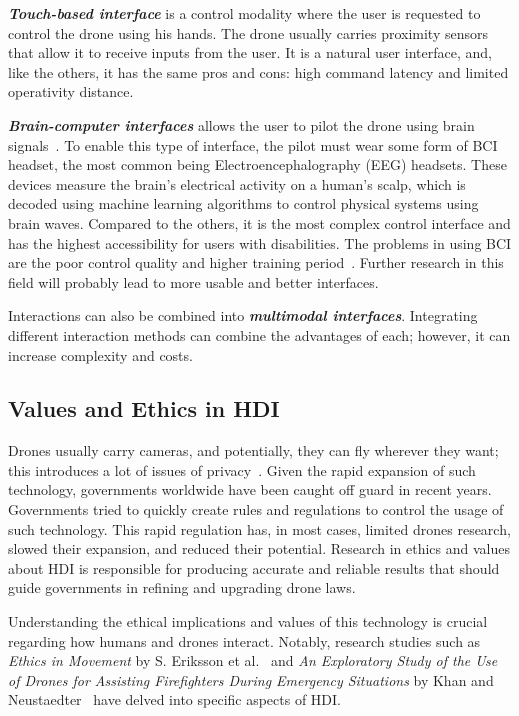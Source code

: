 \textbf{\textit{Touch-based interface}} is a control modality where the user is requested to control the drone using his hands. 
The drone usually carries proximity sensors that allow it to receive inputs from the user. 
It is a natural user interface, and, like the others, it has the same pros and cons: high command latency and limited operativity distance.

\textbf{\textit{Brain-computer interfaces}} allows the user to pilot the drone using brain signals~\cite{lafleur2013quadcopterBCI}.
To enable this type of interface, the pilot must wear some form of BCI headset, the most common being 
Electroencephalography (EEG) headsets. These devices measure the brain's electrical activity on a human's scalp, 
which is decoded using machine learning algorithms to control physical systems using brain waves. 
Compared to the others, it is the most complex control interface and has the highest accessibility for users with disabilities. 
The problems in using BCI are the poor control quality and higher training period~\cite{kawala2021summary}. 
Further research in this field will probably lead to more usable and better interfaces.

Interactions can also be combined into \textbf{\textit{multimodal interfaces}}. 
Integrating different interaction methods can combine the advantages of each; however, it can increase complexity and costs.

\subsection{Values and Ethics in HDI}\label{subsec:hdi_ethics}
Drones usually carry cameras, and potentially, they can fly wherever they want; this introduces a lot of issues of privacy~\cite{anderson2012accidentally}.
Given the rapid expansion of such technology, governments worldwide have been caught off guard in recent years. 
Governments tried to quickly create rules and regulations to control the usage of such technology. 
This rapid regulation has, in most cases, limited drones research, slowed their expansion, and reduced their potential.
Research in ethics and values about HDI is responsible for producing accurate and reliable results that should guide 
governments in refining and upgrading drone laws.

Understanding the ethical implications and values of this technology is crucial regarding how humans and drones interact. 
Notably, research studies such as \textit{Ethics in Movement} by S. Eriksson et al.~\cite{eriksson2020ethicsInMovement} and 
\textit{An Exploratory Study of the Use of Drones for Assisting Firefighters During Emergency Situations} by Khan and Neustaedter~\cite{khan2019exploratory} have delved into specific aspects of HDI.

